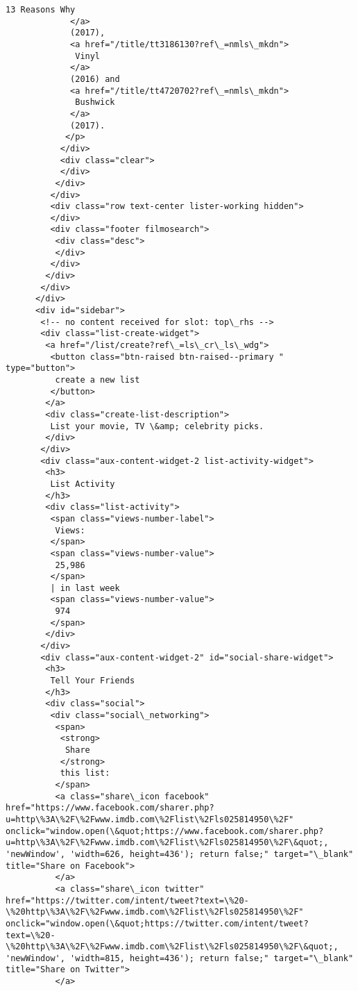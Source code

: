 \documentclass[11pt]{article}
\begin{document}
\begin{Verbatim}[commandchars=\\\{\}]
              13 Reasons Why
             </a>
             (2017),
             <a href="/title/tt3186130?ref\_=nmls\_mkdn">
              Vinyl
             </a>
             (2016) and
             <a href="/title/tt4720702?ref\_=nmls\_mkdn">
              Bushwick
             </a>
             (2017).
            </p>
           </div>
           <div class="clear">
           </div>
          </div>
         </div>
         <div class="row text-center lister-working hidden">
         </div>
         <div class="footer filmosearch">
          <div class="desc">
          </div>
         </div>
        </div>
       </div>
      </div>
      <div id="sidebar">
       <!-- no content received for slot: top\_rhs -->
       <div class="list-create-widget">
        <a href="/list/create?ref\_=ls\_cr\_ls\_wdg">
         <button class="btn-raised btn-raised--primary " type="button">
          create a new list
         </button>
        </a>
        <div class="create-list-description">
         List your movie, TV \&amp; celebrity picks.
        </div>
       </div>
       <div class="aux-content-widget-2 list-activity-widget">
        <h3>
         List Activity
        </h3>
        <div class="list-activity">
         <span class="views-number-label">
          Views:
         </span>
         <span class="views-number-value">
          25,986
         </span>
         | in last week
         <span class="views-number-value">
          974
         </span>
        </div>
       </div>
       <div class="aux-content-widget-2" id="social-share-widget">
        <h3>
         Tell Your Friends
        </h3>
        <div class="social">
         <div class="social\_networking">
          <span>
           <strong>
            Share
           </strong>
           this list:
          </span>
          <a class="share\_icon facebook" href="https://www.facebook.com/sharer.php?u=http\%3A\%2F\%2Fwww.imdb.com\%2Flist\%2Fls025814950\%2F" onclick="window.open(\&quot;https://www.facebook.com/sharer.php?u=http\%3A\%2F\%2Fwww.imdb.com\%2Flist\%2Fls025814950\%2F\&quot;, 'newWindow', 'width=626, height=436'); return false;" target="\_blank" title="Share on Facebook">
          </a>
          <a class="share\_icon twitter" href="https://twitter.com/intent/tweet?text=\%20-\%20http\%3A\%2F\%2Fwww.imdb.com\%2Flist\%2Fls025814950\%2F" onclick="window.open(\&quot;https://twitter.com/intent/tweet?text=\%20-\%20http\%3A\%2F\%2Fwww.imdb.com\%2Flist\%2Fls025814950\%2F\&quot;, 'newWindow', 'width=815, height=436'); return false;" target="\_blank" title="Share on Twitter">
          </a>

\end{Verbatim}
\end{document}
